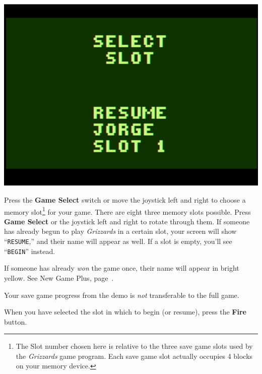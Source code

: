 \documentclass[10pt,twocolumn,openany,article]{memoir}
\begin{document}
\begin{center}
  \includegraphics[width=\columnwidth]{../Manual/SelectSlotNTSC.png}
\end{center}

Press  the \textbf{Game  Select} switch  or move  the joystick  left and
right to  choose a  memory slot\ifdefined\ATARIAGESAVE\else\footnote{The
  Slot number chosen here is relative  to the three save game slots used
  by the \textit{Grizzards}  game program. Each save  game slot actually
  occupies  4  blocks  on  your  memory  device.}\fi{}  for  your  game.
There  are \ifdefined\ATARIAGESAVE  eight \else  three \fi  memory slots
possible. Press \textbf{Game  Select} or the joystick left  and right to
rotate   through  them.   If   someone  has   already   begun  to   play
\textit{Grizzards}   in  a   certain   slot,  your   screen  will   show
``\texttt{RESUME},'' and  their name will appear  as well. If a  slot is
empty, you'll see ``\texttt{BEGIN}'' instead.

If someone has already \emph{won} the  game once, their name will appear
in bright yellow. See New Game Plus, page~\pageref{sec:NewGamePlus}.

\ifdefined\DEMO

\skip

Your save game progress from the demo is \emph{not} transferable to the
full game.

\skip

\fi

When you have selected the slot in which to begin (or resume), press the
\textbf{Fire} button.

\fi
\end{document}
